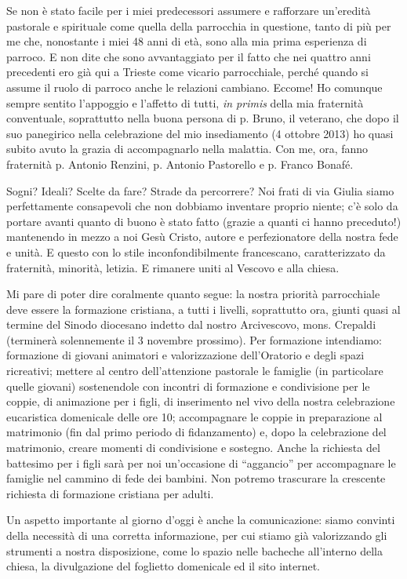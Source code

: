 Se non è stato facile per i miei predecessori assumere e rafforzare un’eredità pastorale e 
spirituale come quella della parrocchia in questione, tanto di più per me che, nonostante i miei 48 
anni di età, sono alla mia prima esperienza di parroco. E non dite che sono avvantaggiato per il fatto 
che nei quattro anni precedenti ero già qui a Trieste come vicario parrocchiale, perché quando si 
assume il ruolo di parroco anche le relazioni cambiano. Eccome! Ho comunque sempre sentito 
l’appoggio e l’affetto di tutti, \textit{in primis} della mia fraternità conventuale, soprattutto nella buona 
persona di p. Bruno, il veterano, che dopo il suo panegirico nella celebrazione del mio insediamento 
(4 ottobre 2013) ho quasi subito avuto la grazia di accompagnarlo nella malattia. Con me, ora, 
fanno fraternità p. Antonio Renzini, p. Antonio Pastorello e p. Franco Bonafé. 

Sogni? Ideali? Scelte da fare? Strade da percorrere? Noi frati di via Giulia siamo 
perfettamente consapevoli che non dobbiamo inventare proprio niente; c’è solo da portare avanti 
quanto di buono è stato fatto (grazie a quanti ci hanno preceduto!) mantenendo in mezzo a noi Gesù 
Cristo, autore e perfezionatore della nostra fede e unità. E questo con lo stile inconfondibilmente 
francescano, caratterizzato da fraternità, minorità, letizia. E rimanere uniti al Vescovo e alla chiesa. 

Mi pare di poter dire coralmente quanto segue: la nostra priorità parrocchiale deve essere la 
formazione  cristiana, a tutti i livelli, soprattutto ora, giunti quasi al termine del Sinodo diocesano 
indetto dal nostro Arcivescovo, mons. Crepaldi (terminerà solennemente il 3 novembre prossimo).
Per formazione intendiamo: formazione di giovani animatori e valorizzazione dell’Oratorio e degli 
spazi ricreativi; mettere al centro dell’attenzione pastorale le famiglie (in particolare quelle giovani) 
sostenendole con incontri di formazione e condivisione per le coppie, di animazione per i figli, di 
inserimento nel vivo della nostra celebrazione eucaristica domenicale delle ore 10; accompagnare le 
coppie in preparazione al matrimonio (fin dal primo periodo di fidanzamento) e, dopo la 
celebrazione del matrimonio, creare momenti di condivisione e sostegno. Anche la richiesta del 
battesimo per i figli sarà per noi un’occasione di “aggancio” per accompagnare le famiglie nel 
cammino di fede dei bambini. Non potremo trascurare la crescente richiesta di formazione cristiana 
per adulti.

Un aspetto importante al giorno d'oggi è anche la comunicazione: siamo convinti della necessità di una corretta
informazione, per cui stiamo già valorizzando gli strumenti a nostra disposizione, come lo spazio nelle bacheche all'interno della chiesa, la divulgazione del foglietto domenicale ed il sito internet.

